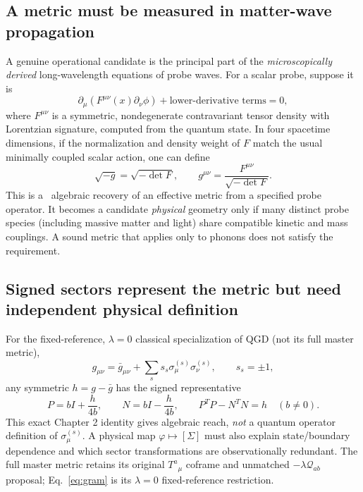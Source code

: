 \documentclass[11pt,a4paper]{article}
\theoremstyle{remark}\newtheorem{remark}[theorem]{Remark}
\begin{document}
\subsection{A metric must be measured in matter-wave propagation}
A genuine operational candidate is the principal part of the \emph{microscopically derived} long-wavelength equations of probe waves. For a scalar probe, suppose it is
\begin{equation}\label{eq:principal}
\partial_\mu\left(F^{\mu\nu}(x)\partial_\nu\phi\right)+\text{lower-derivative terms}=0,
\end{equation}
where $F^{\mu\nu}$ is a symmetric, nondegenerate contravariant tensor density with Lorentzian signature, computed from the quantum state. In four spacetime dimensions, if the normalization and density weight of $F$ match the usual minimally coupled scalar action, one can define
\begin{equation}\label{eq:fromF}
\boxed{\sqrt{-g}=\sqrt{-\det F},\qquad g^{\mu\nu}=\frac{F^{\mu\nu}}{\sqrt{-\det F}}.}
\end{equation}
This is a \D\ algebraic recovery of an effective metric from a specified probe operator. It becomes a candidate \emph{physical} geometry only if many distinct probe species (including massive matter and light) share compatible kinetic and mass couplings. A sound metric that applies only to phonons does not satisfy the requirement.

\subsection{Signed sectors represent the metric but need independent physical definition}
For the fixed-reference, $\lambda=0$ classical specialization of QGD (not its full master metric),
\begin{equation}\label{eq:gram}
g_{\mu\nu}=\bar g_{\mu\nu}+\sum_s s_s\sigma_\mu^{(s)}\sigma_\nu^{(s)},\qquad s_s=\pm1,
\end{equation}
any symmetric $h=g-\bar g$ has the signed representative
\begin{equation}\label{eq:pn}
P=bI+\frac{h}{4b},\qquad N=bI-\frac{h}{4b},\qquad P^TP-N^TN=h\quad (b\ne0).
\end{equation}
This exact Chapter 2 identity gives algebraic reach, \emph{not} a quantum operator definition of $\sigma_\mu^{(s)}$. A physical map $\varphi\mapsto[\Sigma]$ must also explain state/boundary dependence and which sector transformations are observationally redundant. The full master metric retains its original $T^a{}_{\mu}$ coframe and unmatched $-\lambda\mathcal Q_{ab}$ proposal; Eq.~\eqref{eq:gram} is its $\lambda=0$ fixed-reference restriction.
\end{document}
